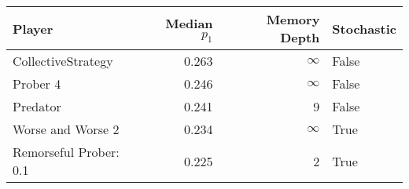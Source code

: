 \begin{tabular}{lrrl}
\toprule
                 Player &  Median $p_1$ &  Memory Depth & Stochastic \\
\midrule
     CollectiveStrategy &         0.263 &            \(\infty\) &      False \\
               Prober 4 &         0.246 &            \(\infty\) &      False \\
               Predator &         0.241 &             9 &      False \\
      Worse and Worse 2 &         0.234 &            \(\infty\) &       True \\
 Remorseful Prober: 0.1 &         0.225 &             2 &       True \\
\bottomrule
\end{tabular}
